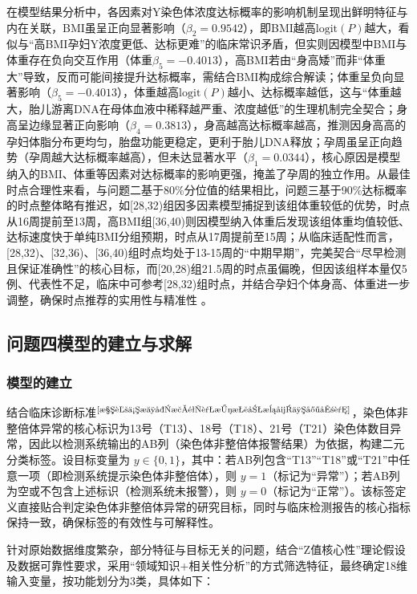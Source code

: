 \documentclass[withoutpreface,bwprint]{cumcmthesis} %
\begin{document}
在模型结果分析中，各因素对Y染色体浓度达标概率的影响机制呈现出鲜明特征与内在关联，BMI虽呈正向显著影响（$\beta_2=0.9542$），即BMI越高$\text{logit}(P)$越大，看似与“高BMI孕妇Y浓度更低、达标更难”的临床常识矛盾，但实则因模型中BMI与体重存在负向交互作用（体重$\beta_5=-0.4013$），高BMI若由“身高矮”而非“体重大”导致，反而可能间接提升达标概率，需结合BMI构成综合解读；体重呈负向显著影响（$\beta_5=-0.4013$），体重越高$\text{logit}(P)$越小、达标概率越低，这与“体重越大，胎儿游离DNA在母体血液中稀释越严重、浓度越低”的生理机制完全契合；身高呈边缘显著正向影响（$\beta_4=0.3813$），身高越高达标概率越高，推测因身高高的孕妇体脂分布更均匀，胎盘功能更稳定，更利于胎儿DNA释放；孕周虽呈正向趋势（孕周越大达标概率越高），但未达显著水平（$\beta_1=0.0344$），核心原因是模型纳入的BMI、体重等因素对达标概率的影响更强，掩盖了孕周的独立作用。从最佳时点合理性来看，与问题二基于80\%分位值的结果相比，问题三基于90\%达标概率的时点整体略有推迟，如[28,32)组因多因素模型捕捉到该组体重较低的优势，时点从16周提前至13周，高BMI组[36,40)则因模型纳入体重后发现该组体重均值较低、达标速度快于单纯BMI分组预期，时点从17周提前至15周；从临床适配性而言，[28,32)、[32,36)、[36,40)组时点均处于13-15周的“中期早期”，完美契合“尽早检测且保证准确性”的核心目标，而[20,28)组21.5周的时点虽偏晚，但因该组样本量仅5例、代表性不足，临床中可参考[28,32)组时点，并结合孕妇个体身高、体重进一步调整，确保时点推荐的实用性与精准性 。



\subsection{问题四模型的建立与求解}

\subsubsection{模型的建立}

结合临床诊断标准$^\text{\cite{染色体核型检验诊断报告模式专家共识}}$，染色体非整倍体异常的核心标识为13号（T13）、18号（T18）、21号（T21）染色体数目异常，因此以检测系统输出的AB列（染色体非整倍体报警结果）为依据，构建二元分类标签。设目标变量为 $ y \in \{0,1\} $，其中：若AB列包含“T13”“T18”或“T21”中任意一项（即检测系统提示染色体非整倍体），则 $ y=1 $（标记为“异常”）；若AB列为空或不包含上述标识（检测系统未报警），则 $ y=0 $（标记为“正常”）。该标签定义直接贴合判定染色体非整倍体异常的研究目标，同时与临床检测报告的核心指标保持一致，确保标签的有效性与可解释性。

针对原始数据维度繁杂，部分特征与目标无关的问题，结合“Z值核心性”理论假设及数据可靠性要求，采用“领域知识+相关性分析”的方式筛选特征，最终确定18维输入变量，按功能划分为3类，具体如下：  
\end{document}
